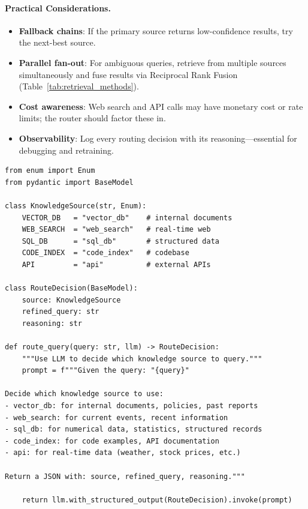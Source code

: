 \paragraph{Practical Considerations.}
\label{practical-considerations.}

\begin{itemize}
  \item \textbf{Fallback chains}: If the primary source returns low-confidence results, try the next-best source.
  \item \textbf{Parallel fan-out}: For ambiguous queries, retrieve from multiple sources simultaneously and fuse results via Reciprocal Rank Fusion (Table~\ref{tab:retrieval_methods}).
  \item \textbf{Cost awareness}: Web search and API calls may have monetary cost or rate limits; the router should factor these in.
  \item \textbf{Observability}: Log every routing decision with its reasoning---essential for debugging and retraining.
\end{itemize}

\begin{lstlisting}[style=pythonstyle, caption={Multi-source agentic RAG router}]
from enum import Enum
from pydantic import BaseModel

class KnowledgeSource(str, Enum):
    VECTOR_DB   = "vector_db"    # internal documents
    WEB_SEARCH  = "web_search"   # real-time web
    SQL_DB      = "sql_db"       # structured data
    CODE_INDEX  = "code_index"   # codebase
    API         = "api"          # external APIs

class RouteDecision(BaseModel):
    source: KnowledgeSource
    refined_query: str
    reasoning: str

def route_query(query: str, llm) -> RouteDecision:
    """Use LLM to decide which knowledge source to query."""
    prompt = f"""Given the query: "{query}"
    
Decide which knowledge source to use:
- vector_db: for internal documents, policies, past reports
- web_search: for current events, recent information
- sql_db: for numerical data, statistics, structured records
- code_index: for code examples, API documentation
- api: for real-time data (weather, stock prices, etc.)

Return a JSON with: source, refined_query, reasoning."""
    
    return llm.with_structured_output(RouteDecision).invoke(prompt)
\end{lstlisting}

